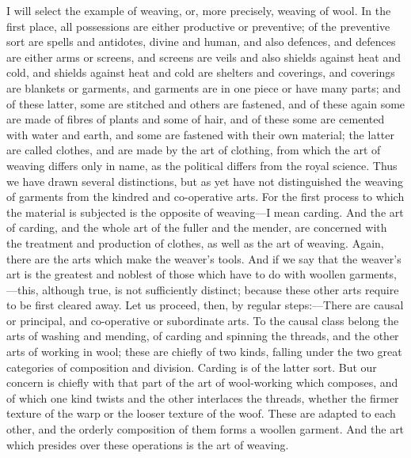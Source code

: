 \documentclass[11pt,letter]{article}
\begin{document}
\par  I will select the example of weaving, or, more precisely, weaving of wool. In the first place, all possessions are either productive or preventive; of the preventive sort are spells and antidotes, divine and human, and also defences, and defences are either arms or screens, and screens are veils and also shields against heat and cold, and shields against heat and cold are shelters and coverings, and coverings are blankets or garments, and garments are in one piece or have many parts; and of these latter, some are stitched and others are fastened, and of these again some are made of fibres of plants and some of hair, and of these some are cemented with water and earth, and some are fastened with their own material; the latter are called clothes, and are made by the art of clothing, from which the art of weaving differs only in name, as the political differs from the royal science. Thus we have drawn several distinctions, but as yet have not distinguished the weaving of garments from the kindred and co-operative arts. For the first process to which the material is subjected is the opposite of weaving—I mean carding. And the art of carding, and the whole art of the fuller and the mender, are concerned with the treatment and production of clothes, as well as the art of weaving. Again, there are the arts which make the weaver's tools. And if we say that the weaver's art is the greatest and noblest of those which have to do with woollen garments,—this, although true, is not sufficiently distinct; because these other arts require to be first cleared away. Let us proceed, then, by regular steps:—There are causal or principal, and co-operative or subordinate arts. To the causal class belong the arts of washing and mending, of carding and spinning the threads, and the other arts of working in wool; these are chiefly of two kinds, falling under the two great categories of composition and division. Carding is of the latter sort. But our concern is chiefly with that part of the art of wool-working which composes, and of which one kind twists and the other interlaces the threads, whether the firmer texture of the warp or the looser texture of the woof. These are adapted to each other, and the orderly composition of them forms a woollen garment. And the art which presides over these operations is the art of weaving.
\end{document}
